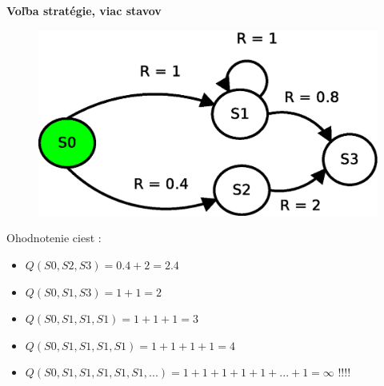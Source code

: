 \documentclass[xcolor=dvipsnames]{beamer}
\begin{document}
\begin{frame}{\bf Voľba stratégie, viac stavov}

  \begin{figure}[!htb]
  \centering
  \includegraphics[scale=.6]{../diagrams/rf_cycle_states.eps}
  \end{figure}

  Ohodnotenie ciest :
  \begin{itemize}
    \item $Q(S0, S2, S3) = 0.4+2 = 2.4$
    \item $Q(S0, S1, S3) = 1+1 = 2$
    \item $Q(S0, S1, S1, S1) = 1+1+1 = 3$
    \item $Q(S0, S1, S1, S1, S1) = 1+1+1+1 = 4$
    \item $Q(S0, S1, S1, S1, S1, S1, ...) = 1+1+1+1+1+...+1 = \infty$ !!!!
  \end{itemize}

\end{frame}
\end{document}

